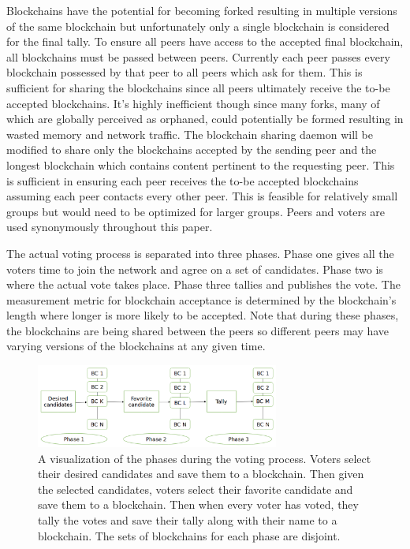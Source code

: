 \documentclass[conference]{IEEEtran}
\begin{document}
Blockchains have the potential for becoming forked resulting in multiple versions of the same blockchain but unfortunately only a single blockchain is considered for the final tally. To ensure all peers have access to the accepted final blockchain, all blockchains must be passed between peers. Currently each peer passes every blockchain possessed by that peer to all peers which ask for them. This is sufficient for sharing the blockchains since all peers ultimately receive the to-be accepted blockchains. It's highly inefficient though since many forks, many of which are globally perceived as orphaned, could potentially be formed resulting in wasted memory and network traffic. The blockchain sharing daemon will be modified to share only the blockchains accepted by the sending peer and the longest blockchain which contains content pertinent to the requesting peer. This is sufficient in ensuring each peer receives the to-be accepted blockchains assuming each peer contacts every other peer. This is feasible for relatively small groups but would need to be optimized for larger groups. Peers and voters are used synonymously throughout this paper.

The actual voting process is separated into three phases. Phase one gives all the voters time to join the network and agree on a set of candidates. Phase two is where the actual vote takes place. Phase three tallies and publishes the vote. The measurement metric for blockchain acceptance is determined by the blockchain's length where longer is more likely to be accepted. Note that during these phases, the blockchains are being shared between the peers so different peers may have varying versions of the blockchains at any given time.

\begin{figure}
	\centering
		\includegraphics[width=80mm]{Flowdiagram.png}
	\caption{A visualization of the phases during the voting process. Voters select their desired candidates and save them to a blockchain. Then given the selected candidates, voters select their favorite candidate and save them to a blockchain. Then when every voter has voted, they tally the votes and save their tally along with their name to a blockchain. The sets of blockchains for each phase are disjoint.}
\end{figure}
\end{document}
